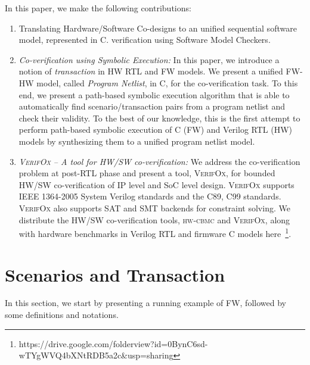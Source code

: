 \documentclass[sigconf]{acmart}
\newcommand{\tool}[1]{\textsc{#1}\xspace}
\newcommand{\hwcbmcv}{\tool{hw-cbmc}}
\newcommand{\verifox}{\tool{VerifOx}}
\begin{document}
In this paper, we make the following contributions:
\begin{enumerate}
\item Translating Hardware/Software Co-designs to an unified 
sequential software model, represented in C.  
verification using Software Model Checkers.
\item {\em Co-verification using Symbolic Execution:} 
In this paper, we introduce a notion of {\em transaction} 
in HW RTL and FW models. We present a unified FW-HW model, 
called {\em Program Netlist}, in C, for the co-verification task. 
To this end, we present a path-based symbolic execution algorithm that is 
able to automatically find scenario/transaction pairs from a 
program netlist and check their validity. 
To the best of our knowledge, this is the first attempt to 
perform path-based symbolic execution of 
C (FW) and Verilog RTL (HW) models by synthesizing 
them to a unified program netlist model. 

\item {\em {\verifox} -- A tool for HW/SW co-verification:} We address the
co-verification problem at post-RTL phase and present a tool, \verifox, for
bounded HW/SW co-verification of IP level and SoC level design.  \verifox
supports IEEE 1364-2005 System Verilog standards and the C89, C99 standards. 
\verifox also supports SAT and SMT backends for constraint solving.  We
distribute the HW/SW co-verification tools, \hwcbmcv and \verifox, along
with hardware benchmarks in Verilog RTL and firmware C models
here~\footnote{https://drive.google.com/folderview?id=0BynC6sd-wTYgWVQ4bXNtRDB5a2c\&usp=sharing}. 
\end{enumerate}

\section{Scenarios and Transaction}
In this section, we start by presenting a running example of FW, followed
by some definitions and notations.\\    
\end{document}
